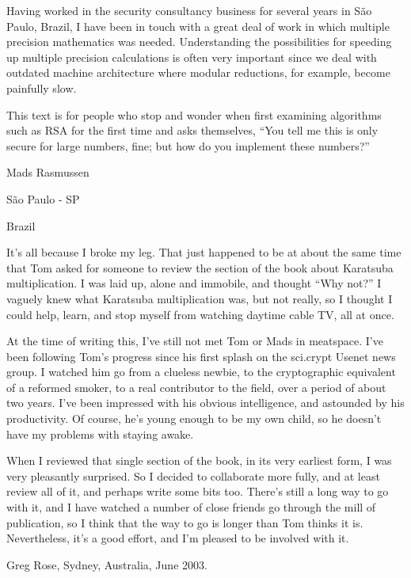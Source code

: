 \documentclass[b5paper]{book}
\begin{document}
Having worked in the security consultancy business for several years in S\~{a}o Paulo, Brazil, I have been in touch with a 
great deal of work in which multiple precision mathematics was needed. Understanding the possibilities for speeding up 
multiple precision calculations is often very important since we deal with outdated machine architecture where modular 
reductions, for example, become painfully slow.

This text is for people who stop and wonder when first examining algorithms such as RSA for the first time and asks 
themselves, ``You tell me this is only secure for large numbers, fine; but how do you implement these numbers?''

\begin{flushright}
Mads Rasmussen

S\~{a}o Paulo - SP

Brazil
\end{flushright}

\newpage
It's all because I broke my leg. That just happened to be at about the same time that Tom asked for someone to review the section of the book about 
Karatsuba multiplication. I was laid up, alone and immobile, and thought ``Why not?'' I vaguely knew what Karatsuba multiplication was, but not 
really, so I thought I could help, learn, and stop myself from watching daytime cable TV, all at once.

At the time of writing this, I've still not met Tom or Mads in meatspace. I've been following Tom's progress since his first splash on the 
sci.crypt Usenet news group. I watched him go from a clueless newbie, to the cryptographic equivalent of a reformed smoker, to a real
contributor to the field, over a period of about two years. I've been impressed with his obvious intelligence, and astounded by his productivity. 
Of course, he's young enough to be my own child, so he doesn't have my problems with staying awake.

When I reviewed that single section of the book, in its very earliest form, I was very pleasantly surprised. So I decided to collaborate more fully, 
and at least review all of it, and perhaps write some bits too. There's still a long way to go with it, and I have watched a number of close 
friends go through the mill of publication, so I think that the way to go is longer than Tom thinks it is. Nevertheless, it's a good effort, 
and I'm pleased to be involved with it.

\begin{flushright}
Greg Rose, Sydney, Australia, June 2003. 
\end{flushright}
\end{document}
